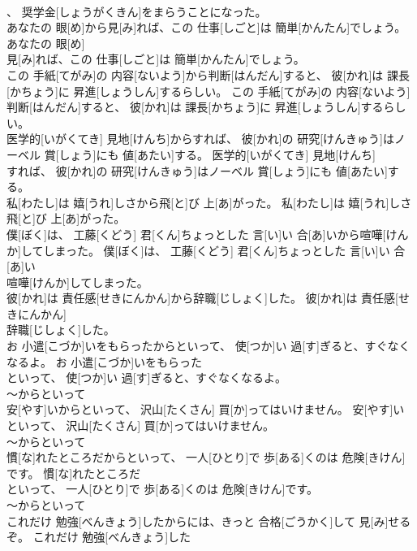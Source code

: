 \documentclass[8pt]{extreport}
\begin{document}
\begin{CJK}{UTF8}{min}
\\	、 奨学金[しょうがくきん]をまらうことになった。	
\\	あなたの 眼[め]から見[み]れば、この 仕事[しごと]は 簡単[かんたん]でしょう。	あなたの 眼[め]
\\	見[み]れば、この 仕事[しごと]は 簡単[かんたん]でしょう。	
\\	この 手紙[てがみ]の 内容[ないよう]から判断[はんだん]すると、 彼[かれ]は 課長[かちょう]に 昇進[しょうしん]するらしい。	この 手紙[てがみ]の 内容[ないよう]
\\	判断[はんだん]すると、 彼[かれ]は 課長[かちょう]に 昇進[しょうしん]するらしい。	
\\	医学的[いがくてき] 見地[けんち]からすれば、 彼[かれ]の 研究[けんきゅう]はノーベル 賞[しょう]にも 値[あたい]する。	医学的[いがくてき] 見地[けんち]
\\	すれば、 彼[かれ]の 研究[けんきゅう]はノーベル 賞[しょう]にも 値[あたい]する。	
\\	私[わたし]は 嬉[うれ]しさから飛[と]び 上[あ]がった。	私[わたし]は 嬉[うれ]しさ
\\	飛[と]び 上[あ]がった。	
\\	僕[ぼく]は、 工藤[くどう] 君[くん]ちょっとした 言[い]い 合[あ]いから喧嘩[けんか]してしまった。	僕[ぼく]は、 工藤[くどう] 君[くん]ちょっとした 言[い]い 合[あ]い
\\	喧嘩[けんか]してしまった。	
\\	彼[かれ]は 責任感[せきにんかん]から辞職[じしょく]した。	彼[かれ]は 責任感[せきにんかん]
\\	辞職[じしょく]した。	
\\	お 小遣[こづか]いをもらったからといって、 使[つか]い 過[す]ぎると、すぐなくなるよ。	お 小遣[こづか]いをもらった
\\	といって、 使[つか]い 過[す]ぎると、すぐなくなるよ。	
\\	～からといって
\\	安[やす]いからといって、 沢山[たくさん] 買[か]ってはいけません。	安[やす]い
\\	といって、 沢山[たくさん] 買[か]ってはいけません。	
\\	～からといって
\\	慣[な]れたところだからといって、 一人[ひとり]で 歩[ある]くのは 危険[きけん]です。	慣[な]れたところだ
\\	といって、 一人[ひとり]で 歩[ある]くのは 危険[きけん]です。	
\\	～からといって
\\	これだけ 勉強[べんきょう]したからには、きっと 合格[ごうかく]して 見[み]せるぞ。	これだけ 勉強[べんきょう]した

\end{CJK}
\end{document}
